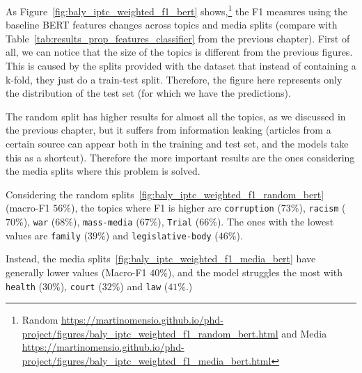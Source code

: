 As Figure~\ref{fig:baly_iptc_weighted_f1_bert} shows,\footnote{Random \url{https://martinomensio.github.io/phd-project/figures/baly_iptc_weighted_f1_random_bert.html} and Media \url{https://martinomensio.github.io/phd-project/figures/baly_iptc_weighted_f1_media_bert.html}} the F1 measures using the baseline BERT features changes across topics and media splits (compare with Table~\ref{tab:results_prop_features_classifier} from the previous chapter).
First of all, we can notice that the size of the topics is different from the previous figures. This is caused by the splits provided with the dataset that instead of containing a k-fold, they just do a train-test split. Therefore, the figure here represents only the distribution of the test set (for which we have the predictions).

The random split has higher results for almost all the topics, as we discussed in the previous chapter, but it suffers from information leaking (articles from a certain source can appear both in the training and test set, and the models take this as a shortcut).
Therefore the more important results are the ones considering the media splits where this problem is solved.

Considering the random splits~\ref{fig:baly_iptc_weighted_f1_random_bert} (macro-F1 $56\%$), the topics where F1 is higher are \texttt{corruption} ($73\%$), \texttt{racism} ($70\%$), \texttt{war} ($68\%$), \texttt{mass-media} ($67\%$), \texttt{Trial} ($66\%$). The ones with the lowest values are \texttt{family} ($39\%$) and \texttt{legislative-body} ($46\%$).

Instead, the media splits~\ref{fig:baly_iptc_weighted_f1_media_bert} have generally lower values (Macro-F1 $40\%$), and the model struggles the most with \texttt{health} ($30\%$), \texttt{court} ($32\%$) and \texttt{law} ($41\%$.)


